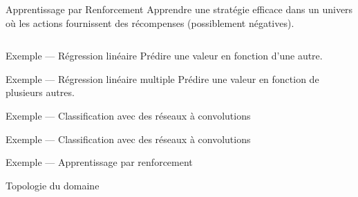 \begin{frame}{Apprentissage par Renforcement}
  Apprendre une stratégie efficace dans un univers où les actions fournissent des récompenses (possiblement négatives).
  \vfill
  \begin{columns}[T]
    \begin{column}{0.5\textwidth}
    \end{column}
    \begin{column}{0.5\textwidth}
    \end{column}
  \end{columns}
\end{frame}

\begin{frame}{Exemple --- Régression linéaire}
  Prédire une valeur en fonction d'une autre.

\end{frame}

\begin{frame}{Exemple --- Régression linéaire multiple}
  Prédire une valeur en fonction de plusieurs autres.

\end{frame}

\begin{frame}{Exemple --- Classification avec des réseaux à convolutions}
\end{frame}

\begin{frame}{Exemple --- Classification avec des réseaux à convolutions}
\end{frame}

\begin{frame}{Exemple --- Apprentissage par renforcement}
\end{frame}

\begin{frame}{Topologie du domaine}
\end{frame}

